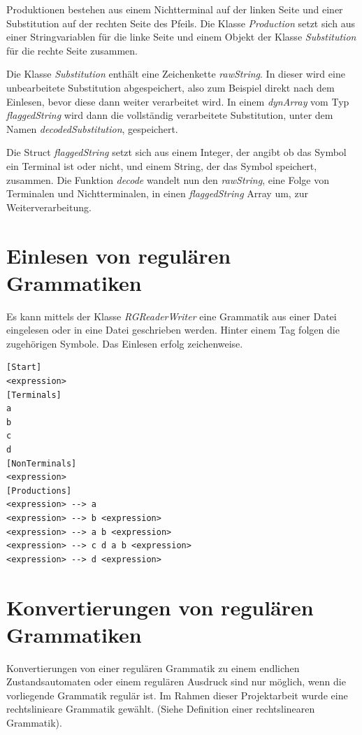 Produktionen bestehen aus einem Nichtterminal auf der linken Seite und einer
Substitution auf der rechten Seite des Pfeils. Die Klasse \textit{Production}
setzt sich aus einer Stringvariablen für die linke Seite und einem Objekt der Klasse
\textit{Substitution} für die rechte Seite zusammen.

Die Klasse \textit{Substitution} enthält eine Zeichenkette \textit{rawString}.
In dieser wird eine unbearbeitete Substitution abgespeichert, also zum Beispiel
direkt nach dem Einlesen, bevor diese dann weiter verarbeitet wird. In einem
\textit{dynArray} vom Typ \textit{flaggedString} wird dann die vollständig
verarbeitete Substitution, unter dem Namen \textit{decodedSubstitution},
gespeichert.

Die Struct \textit{flaggedString} setzt sich aus einem Integer,
der angibt ob das Symbol ein Terminal ist oder nicht, und einem String, der das
Symbol speichert, zusammen. Die Funktion \textit{decode} wandelt nun den
\textit{rawString}, eine Folge von Terminalen und Nichtterminalen, in einen
\textit{flaggedString} Array um, zur Weiterverarbeitung.

\section{Einlesen von regulären Grammatiken}

Es kann mittels der Klasse \textit{RGReaderWriter} eine Grammatik aus einer
Datei eingelesen oder in eine Datei geschrieben werden. Hinter einem Tag folgen die
zugehörigen Symbole. Das Einlesen erfolg zeichenweise.

\lstset{language=C, basicstyle=\footnotesize}
\begin{lstlisting}[float=h!, frame=tb, captionpos=b, caption={Beispiel zu
einem Textdatei der einen Grammatik darstellt.}, label=list:TextGrammar]
[Start]
<expression>
[Terminals]
a
b
c
d
[NonTerminals]
<expression>
[Productions]
<expression> --> a
<expression> --> b <expression>
<expression> --> a b <expression>
<expression> --> c d a b <expression>
<expression> --> d <expression>
\end{lstlisting}
 
\section{Konvertierungen von regulären Grammatiken}

Konvertierungen von einer regulären Grammatik zu einem endlichen Zustandsautomaten
oder einem regulären Ausdruck sind nur möglich, wenn die vorliegende Grammatik
regulär ist. Im Rahmen dieser Projektarbeit wurde eine rechtslinieare Grammatik gewählt.
(Siehe Definition einer rechtslinearen Grammatik).


